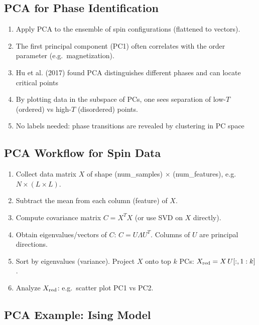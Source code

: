 \documentclass[%
oneside,                 %
final,                   %
10pt]{article}
\begin{document}
\subsection{PCA for Phase Identification}
\begin{enumerate}
\item Apply PCA to the ensemble of spin configurations (flattened to vectors).

\item The first principal component (PC1) often correlates with the order parameter (e.g.\ magnetization).

\item Hu et al. (2017) found PCA distinguishes different phases and can locate critical points 

\item By plotting data in the subspace of PCs, one sees separation of low-$T$ (ordered) vs high-$T$ (disordered) points.

\item No labels needed: phase transitions are revealed by clustering in PC space 
\end{enumerate}

\noindent
\subsection{PCA Workflow for Spin Data}

\begin{enumerate}
\item Collect data matrix $X$ of shape (num\_samples) $\times$ (num\_features), e.g.~$N\times (L\times L)$.

\item Subtract the mean from each column (feature) of $X$.

\item Compute covariance matrix $C = X^T X$ (or use SVD on $X$ directly).

\item Obtain eigenvalues/vectors of $C$: $C = U \Lambda U^T$. Columns of $U$ are principal directions.

\item Sort by eigenvalues (variance). Project $X$ onto top $k$ PCs: $X_{\rm red} = X\,U[:,1:k]$.

\item Analyze $X_{\rm red}$: e.g.~scatter plot PC1 vs PC2.
\end{enumerate}

\noindent
\subsection{PCA Example: Ising Model}
\end{document}
